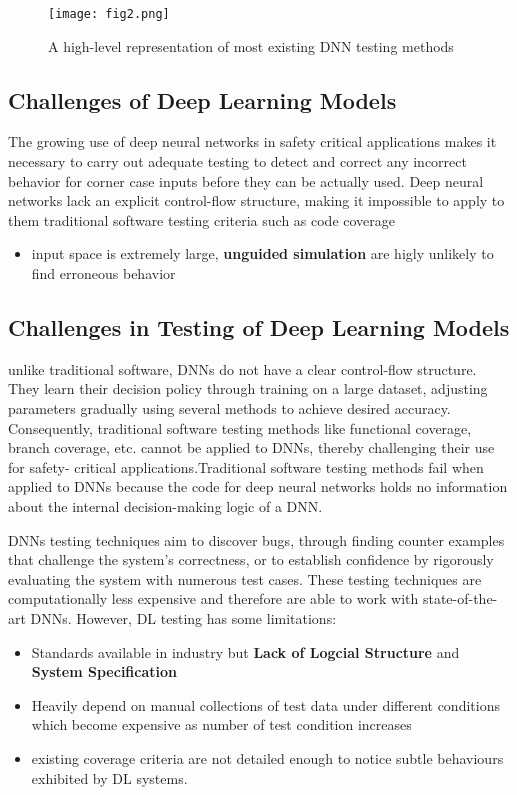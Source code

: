\begin{figure*}[h]
	\centering
	\texttt{[image: fig2.png]}
	\caption{A high-level representation of most existing DNN
	testing methods \cite{Intro_1}}
	\label{fig:2}
\end{figure*}
	
\subsection{Challenges of Deep Learning Models}
The growing use of deep neural networks in safety critical applications makes it necessary to carry out adequate testing to detect and correct any incorrect behavior for corner case
inputs before they can be actually used. Deep neural networks
lack an explicit control-flow structure, making it impossible to
apply to them traditional software testing criteria such as code
coverage

\begin{itemize}
	\item input space is extremely large, \textbf{unguided simulation} are higly unlikely to find erroneous behavior
   \end{itemize}

\subsection{Challenges in Testing of Deep Learning Models} \hypertarget{challenges}{}
unlike traditional software, DNNs do not have a clear control-flow structure. They learn their decision policy through training on a large dataset, adjusting parameters gradually using several methods to achieve desired accuracy. Consequently, traditional software testing methods like functional coverage, branch coverage, etc. cannot be applied to DNNs, thereby challenging their use for safety- critical applications.Traditional software testing methods fail when applied to DNNs because the code for deep neural networks holds no information about the internal decision-making logic of a DNN.


DNNs testing techniques aim to discover bugs, through finding counter examples that challenge the system's correctness, or to establish confidence by rigorously evaluating the system with numerous test cases. These testing techniques are computationally less expensive and therefore are able to work with state-of-the- art DNNs. However, DL testing has some limitations:
\begin{itemize}
    \item Standards available in industry but \textbf{Lack of Logcial Structure} and \textbf{System Specification}  
     \item Heavily depend on manual collections of test data under different conditions which become expensive as number of test condition increases
     \item  existing coverage criteria are not detailed enough to notice subtle behaviours exhibited by DL systems.
\end{itemize}

